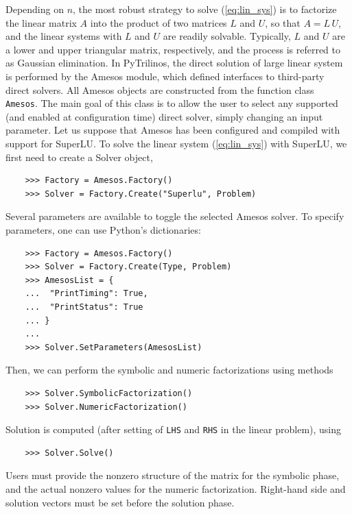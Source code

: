 \documentclass[10pt,relax]{SANDreport}
\begin{document}
Depending on $n$, the most robust strategy to solve (\ref{eq:lin_sys})
is to factorize the linear matrix $A$ into the product of two matrices
$L$ and $U$, so that $A = L \, U$, and the linear systems with $L$ and
$U$ are readily solvable. Typically, $L$ and $U$ are a lower and upper
triangular matrix, respectively, and the process is referred to as
Gaussian elimination. In PyTrilinos, the direct solution of large linear
system is performed by the Amesos module, which defined interfaces to
third-party direct solvers.
All Amesos objects are constructed from the function class {\tt
  Amesos}.   The main goal of this class is to allow the user to select
any supported (and enabled at configuration time) direct solver,
simply changing an input parameter. Let us suppose that Amesos has
been configured and compiled with support for SuperLU. To solve the
linear system (\ref{eq:lin_sys}) with SuperLU, we first need to create
a Solver object,
\begin{verbatim}
    >>> Factory = Amesos.Factory()
    >>> Solver = Factory.Create("Superlu", Problem)
\end{verbatim}
Several parameters are available to toggle the selected Amesos solver.
To specify parameters, one can use Python's dictionaries:
\begin{verbatim}
    >>> Factory = Amesos.Factory()
    >>> Solver = Factory.Create(Type, Problem)
    >>> AmesosList = {
    ...  "PrintTiming": True,
    ...  "PrintStatus": True
    ... }
    ...
    >>> Solver.SetParameters(AmesosList)
\end{verbatim}
Then, we can perform the symbolic and numeric factorizations using methods
\begin{verbatim}
    >>> Solver.SymbolicFactorization()
    >>> Solver.NumericFactorization()
\end{verbatim}
Solution is computed (after
setting of {\tt LHS} and {\tt RHS} in the linear problem), using
\begin{verbatim}
    >>> Solver.Solve()
\end{verbatim}
Users must provide the nonzero structure of the matrix for the symbolic
phase, and the actual nonzero values for the numeric
factorization. Right-hand side and solution vectors must be set before
the solution phase.
  
\end{document}
